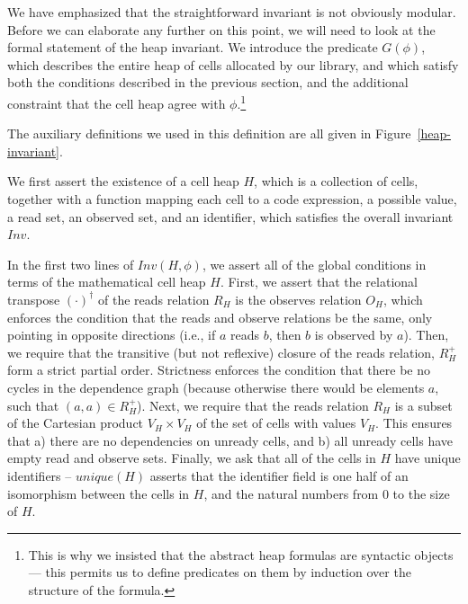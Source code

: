 We have emphasized that the straightforward invariant is not obviously
modular. Before we can elaborate any further on this point, we will
need to look at the formal statement of the heap invariant. We
introduce the predicate $G(\phi)$, which describes the entire heap of
cells allocated by our library, and which satisfy both the conditions
described in the previous section, and the additional constraint that
the cell heap agree with $\phi$.\footnote{This is why we insisted that
  the abstract heap formulas are syntactic objects --- this permits us
  to define predicates on them by induction over the structure of the
formula.}



The auxiliary definitions we used in this definition are all given in
Figure~\ref{heap-invariant}. 

We first assert the existence of a cell heap $H$, which is a
collection of cells, together with a function mapping each cell to a
code expression, a possible value, a read set, an observed set, and an
identifier, which satisfies the overall invariant $Inv$.

In the first two lines of $Inv(H, \phi)$, we assert all of the global 
conditions in terms of the mathematical cell heap $H$. First, we assert that 
the relational transpose $(\cdot)^\dagger$ of the reads relation $R_H$ is the
observes relation $O_H$, which enforces the condition that the reads
and observe relations be the same, only pointing in opposite
directions (i.e., if $a$ reads $b$, then $b$ is observed by
$a$). Then, we require that the transitive (but not reflexive) closure
of the reads relation, $R^+_H$ form a strict partial order. Strictness
enforces the condition that there be no cycles in the dependence graph
(because otherwise there would be elements $a$, such that $(a, a) \in
R^+_H$).  Next, we require that the reads relation $R_H$ is a subset of
the Cartesian product $V_H \times V_H$ of the set of cells with values
$V_H$. This ensures that a) there are no dependencies on unready
cells, and b) all unready cells have empty read and observe
sets. Finally, we ask that all of the cells in $H$ have unique
identifiers -- $unique(H)$ asserts that the identifier field is one
half of an isomorphism between the cells in $H$, and the natural
numbers from 0 to the size of $H$.

